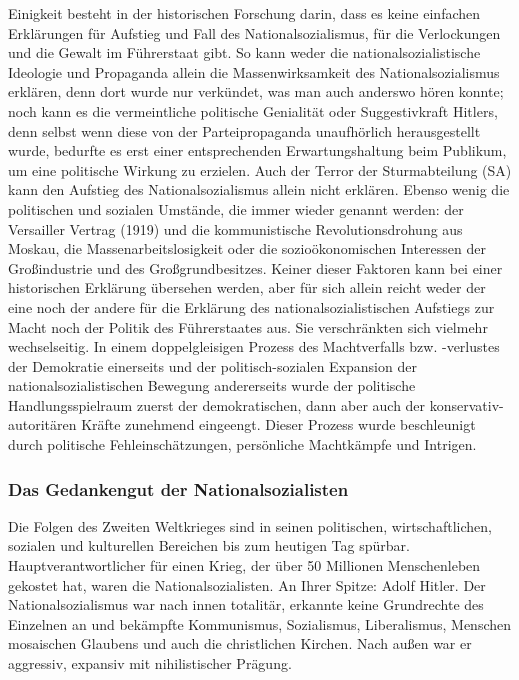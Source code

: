 \documentclass[letterpaper, 12pt]{article}
\let\tempsubsubsection\subsubsection
\renewcommand\subsubsection[1]{\vspace{0cm}\tempsubsubsection{#1}\vspace{0cm}}
\begin{document}
Einigkeit besteht in der historischen Forschung darin, dass es keine einfachen Erklärungen für Aufstieg und Fall des Nationalsozialismus, für die Verlockungen und die Gewalt im Führerstaat gibt. So kann weder die nationalsozialistische Ideologie und Propaganda allein die Massenwirksamkeit des Nationalsozialismus erklären, denn dort wurde nur verkündet, was man auch anderswo hören konnte; noch kann es die vermeintliche politische Genialität oder Suggestivkraft Hitlers, denn selbst wenn diese von der Parteipropaganda unaufhörlich herausgestellt wurde, bedurfte es erst einer entsprechenden Erwartungshaltung beim Publikum, um eine politische Wirkung zu erzielen. Auch der Terror der Sturmabteilung (SA) kann den Aufstieg des Nationalsozialismus allein nicht erklären. Ebenso wenig die politischen und sozialen Umstände, die immer wieder genannt werden: der Versailler Vertrag (1919) und die kommunistische Revolutionsdrohung aus Moskau, die Massenarbeitslosigkeit oder die sozioökonomischen Interessen der Großindustrie und des Großgrundbesitzes. Keiner dieser Faktoren kann bei einer historischen Erklärung übersehen werden, aber für sich allein reicht weder der eine noch der andere für die Erklärung des nationalsozialistischen Aufstiegs zur Macht noch der Politik des Führerstaates aus. Sie verschränkten sich vielmehr wechselseitig. In einem doppelgleisigen Prozess des Machtverfalls bzw. -verlustes der Demokratie einerseits und der politisch-sozialen Expansion der nationalsozialistischen Bewegung andererseits wurde der politische Handlungsspielraum zuerst der demokratischen, dann aber auch der konservativ-autoritären Kräfte zunehmend eingeengt. Dieser Prozess wurde beschleunigt durch politische Fehleinschätzungen, persönliche Machtkämpfe und Intrigen. 

\subsubsection{Das Gedankengut der Nationalsozialisten}

Die Folgen des Zweiten Weltkrieges sind in seinen politischen, wirtschaftlichen, sozialen und kulturellen Bereichen bis zum heutigen Tag spürbar. Hauptverantwortlicher für einen Krieg, der über 50 Millionen Menschenleben gekostet hat, waren die Nationalsozialisten. An Ihrer Spitze: Adolf Hitler. Der Nationalsozialismus war nach innen totalitär, erkannte keine Grundrechte des Einzelnen an und bekämpfte Kommunismus, Sozialismus, Liberalismus, Menschen mosaischen Glaubens und auch die christlichen Kirchen. Nach außen war er aggressiv, expansiv mit nihilistischer Prägung. \clearpage
\end{document}
